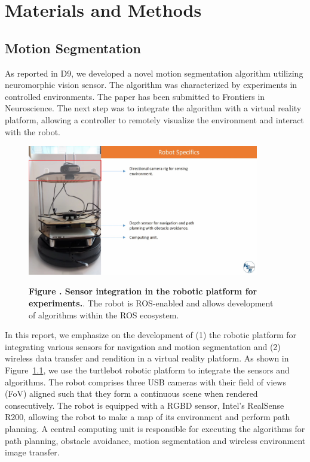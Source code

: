  \chapter{Materials and Methods}

 \section{Motion Segmentation }
As reported in D9, we developed a novel motion segmentation algorithm utilizing neuromorphic vision sensor. The algorithm was characterized by experiments in controlled environments. The paper has been submitted to Frontiers in Neuroscience. The next step was to integrate the algorithm with a virtual reality platform, allowing a controller to remotely visualize the environment and interact with the robot.
\begin{figure}[h!]
	\begin{center}
		\includegraphics[width=0.90\textwidth]{figures/motion-seg/setup}%
	\end{center}
	\textbf{\label{fig:turtle_setup} Figure . Sensor integration in the robotic platform for experiments.}. { The robot is ROS-enabled and allows development of algorithms within the ROS ecosystem. }
\end{figure}

In this report, we emphasize on the development of (1) the robotic platform for integrating various sensors for navigation and motion segmentation and (2) wireless data transfer and rendition in a virtual reality platform. As shown in Figure~\ref{fig:turtle_setup}, we use the turtlebot robotic platform to integrate the sensors and algorithms. The robot comprises three USB cameras with their field of views (FoV) aligned such that they form a continuous scene when rendered consecutively. The robot is equipped with a RGBD sensor, Intel's RealSense R200, allowing the robot to make a map of its environment and perform path planning. A central computing unit is responsible for executing the algorithms for path planning, obstacle avoidance, motion segmentation and wireless environment image transfer. 

